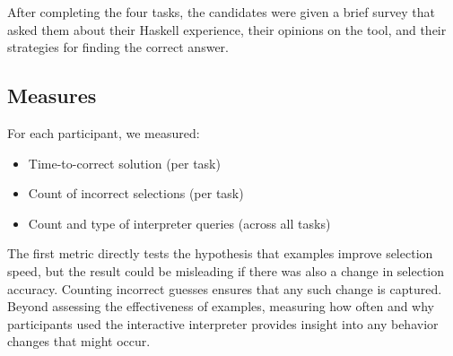 After completing the four tasks, the candidates were given a brief survey
that asked them about their Haskell experience, their opinions on the tool,
and their strategies for finding the correct answer.


\subsection{Measures}

For each participant, we measured:
\begin{itemize}
    \item Time-to-correct solution (per task)
    \item Count of incorrect selections (per task)
    \item Count and type of interpreter queries (across all tasks)
\end{itemize}

The first metric directly tests the hypothesis that examples improve
selection speed, but the result could be misleading if there was also a
change in selection accuracy.
%
Counting incorrect guesses ensures that any such change is captured.
%
Beyond assessing the effectiveness of examples, measuring how often and why
participants used the interactive interpreter provides insight into any
behavior changes that might occur.

